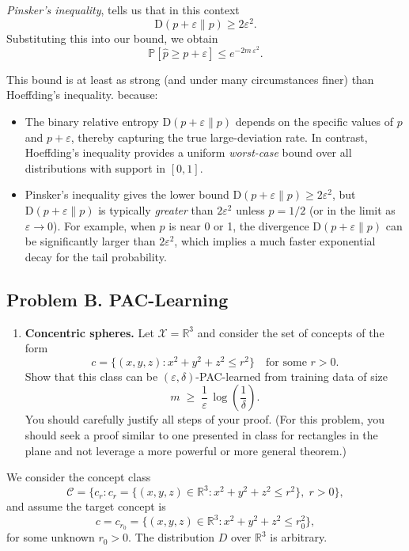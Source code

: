 \documentclass[letterpaper, 11pt]{article}
\newcommand{\1}{\mathds{1}}	%
\theoremstyle{definition}
\newcommand{\Dkl}{\mathrm{D}}
\begin{document}
\emph{Pinsker's inequality}, tells us that in this context
\[
\Dkl(p+\varepsilon \| p) \ge 2\varepsilon^2.
\]
Substituting this into our bound, we obtain
\[
\mathbb{P}\left[\hat{p} \ge p+\varepsilon\right] \le e^{-2m\,\varepsilon^2}.
\]

This bound is at least as strong (and under many circumstances finer) than Hoeffding's inequality.  because:
\begin{itemize}
  \item The binary relative entropy \(\Dkl(p+\varepsilon\|p)\) depends on the specific values of \(p\) and \(p+\varepsilon\), thereby capturing the true large-deviation rate. In contrast, Hoeffding's inequality provides a uniform \emph{worst-case} bound over all distributions with support in \([0,1]\).
  \item Pinsker's inequality gives the lower bound \(\Dkl(p+\varepsilon\|p) \ge 2\varepsilon^2\), but \(\Dkl(p+\varepsilon\|p)\) is typically \emph{greater} than \(2\varepsilon^2\) unless \(p=1/2\) (or in the limit as \(\varepsilon\to 0\)). For example, when \(p\) is near 0 or 1, the divergence \(\Dkl(p+\varepsilon\|p)\) can be significantly larger than \(2\varepsilon^2\), which implies a much faster exponential decay for the tail probability.
\end{itemize}

\subsection*{Problem B. PAC-Learning}
\begin{enumerate}[leftmargin=1.2em,label=\arabic*.]
\item \textbf{Concentric spheres.} Let $\mathcal{X}=\mathbb{R}^3$ and consider the set of concepts of the form
\[
c=\{(x,y,z): x^2+y^2+z^2\le r^2\}\quad\text{for some } r>0.
\]
Show that this class can be $(\varepsilon,\delta)$-PAC-learned from training data of size
\[
m \;\ge\; \frac{1}{\varepsilon}\,\log\!\left(\frac{1}{\delta}\right).
\]
You should carefully justify all steps of your proof. (For this problem, you should seek a proof similar to one presented in class for rectangles in the plane and not leverage a more powerful or more general theorem.)
\end{enumerate}
We consider the concept class
\[
\mathcal{C} = \{ c_r : c_r = \{(x,y,z) \in \mathbb{R}^3 : x^2 + y^2 + z^2 \le r^2\}, \; r > 0\},
\]
and assume the target concept is
\[
c = c_{r_0} = \{(x,y,z) \in \mathbb{R}^3 : x^2 + y^2 + z^2 \le r_0^2\},
\]
for some unknown \(r_0 > 0\). The distribution \(D\) over \(\mathbb{R}^3\) is arbitrary.
\end{document}
